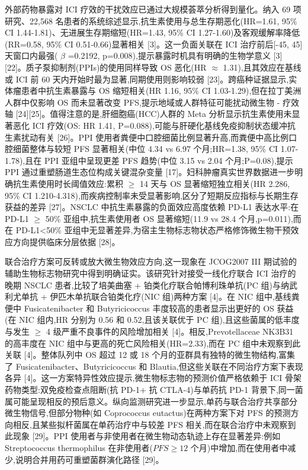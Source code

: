 \documentclass[11pt]{article}
\begin{document}
外部药物暴露对 ICI 疗效的干扰效应已通过大规模荟萃分析得到量化。纳入 69 项研究、22,568 名患者的系统综述显示,抗生素使用与总生存期恶化(HR=1.61, 95\% CI 1.44-1.81)、无进展生存期缩短(HR=1.43, 95\% CI 1.27-1.60)及客观缓解率降低(RR=0.58, 95\% CI 0.51-0.66)显著相关 {[}3{]}。这一负面关联在 ICI 治疗前后{[}-45, 45{]} 天窗口内最强( \(\beta\) =0.2192, p=0.008),提示暴露时机具有明确的生物学意义 {[}3{]}{[}22{]}。质子泵抑制剂(PPIs)的使用同样导致 OS 恶化(HR \(\approx\) 1.31),且其效应在基线或 ICI 前 60 天内开始时最为显著,同期使用则影响较弱 {[}23{]}。跨癌种证据显示,实体瘤患者中抗生素暴露与 OS 缩短相关(HR 1.16, 95\% CI 1.03-1.29),但在拉丁美洲人群中仅影响 OS 而未显著改变 PFS,提示地域或人群特征可能扰动微生物 - 疗效轴 {[}24{]}{[}25{]}。值得注意的是,肝细胞癌(HCC)人群的 Meta 分析显示抗生素使用未显著恶化 ICI 疗效(OS: HR 1.41, P=0.088),可能与肝硬化基线免疫抑制状态缓冲抗生素扰动有关 {[}26{]}。PPI 使用者粪便中口腔细菌比例显著升高,而粪便中高比例口腔细菌整体与较短 PFS 显著相关(中位 4.34 vs 6.97 个月;HR=1.38, 95\% CI 1.07-1.78),且在 PPI 亚组中呈现更差 PFS 趋势(中位 3.15 vs 2.04 个月;P=0.08),提示 PPI 通过重塑肠道生态位构成关键混杂变量 {[}17{]}。妇科肿瘤真实世界数据进一步明确抗生素使用时长阈值效应:累积 \(\geq\) 14 天与 OS 显著缩短独立相关(HR 2.286, 95\% CI 1.210-4.318),而疾病控制率未受显著影响,区分了短期反应指标与长期生存获益的差异 {[}27{]}。NSCLC 中抗生素暴露的负面效应高度依赖 PD-L1 表达水平:在 PD-L1 \(\geq\) 50\% 亚组中,抗生素使用者 OS 显著缩短(11.9 vs 28.4 个月,p=0.011),而在 PD-L1\textless50\% 亚组中无显著差异,为宿主生物标志物状态严格修饰微生物干预效应方向提供临床分层依据 {[}28{]}。

联合治疗方案可反转或放大微生物效应方向,这一现象在 JCOG2007 III 期试验的辅助生物标志物研究中得到明确证实。该研究针对接受一线化疗联合 ICI 治疗的晚期 NSCLC 患者,比较了培美曲塞 + 铂类化疗联合帕博利珠单抗(PC 组)与纳武利尤单抗 + 伊匹木单抗联合铂类化疗(NIC 组)两种方案 {[}4{]}。在 NIC 组中,基线粪便中 Fusicatenibacter 和 Butyricicoccus 丰度较高的患者显示出更好的 OS 获益(在 NIC 组内,HR 分别为 0.56 和 0.52,且该关联优于 PC 组),且这些菌属的低丰度与发生 \(\geq\) 4 级严重不良事件的风险增加相关 {[}4{]}。相反,Prevotellaceae NK3B31 的高丰度在 NIC 组中与更高的死亡风险相关(HR=2.33),而在 PC 组中未观察到此关联 {[}4{]}。整体队列中 OS 超过 12 或 18 个月的亚群具有独特的微生物结构,富集了 Fusicatenibacter、Butyricicoccus 和 Blautia,但这些关联在不同治疗方案下表现各异 {[}4{]}。这一方案特异性效应提示,微生物标志物的预测价值严格依赖于 ICI 骨架药物类型:双免疫检查点阻断(抗 PD-1+ 抗 CTLA-4)与单药抗 PD-1 背景下,同一菌属可能呈现相反的预后意义。纵向监测研究进一步显示,单药与联合治疗共享部分微生物信号,但部分物种(如 Coprococcus eutactus)在两种方案下对 PFS 的预测方向相反,且某些拟杆菌属在单药治疗中与较差 PFS 相关,而在联合治疗中未观察到此现象 {[}29{]}。PPI 使用者与非使用者在微生物动态轨迹上存在显著差异:例如 Streptococcus thermophilus 在非使用者(\(PFS\geq12\) 个月)中增加,而在使用者中减少,说明合并用药可重塑菌群演化路径 {[}29{]}。
\end{document}
